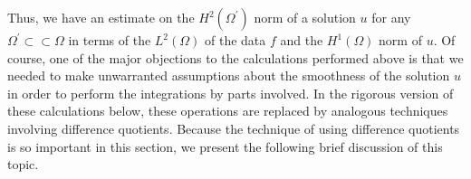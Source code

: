 Thus, we have an estimate on the $H^2(\Omega^{\prime})$ norm of a solution $u$ for any $\Omega^{\prime}\subset\subset\Omega$ in terms of the $L^2(\Omega)$ of the data $f$ and the $H^1(\Omega)$ norm of $u$. Of course, one of the major objections to the calculations performed above is that we needed to make unwarranted assumptions about the smoothness of the solution $u$ in order to perform the integrations by parts involved. In the rigorous version of these calculations below, these operations are replaced by analogous techniques involving difference quotients. Because the technique of using difference quotients is so important in this section, we present the following brief discussion of this topic.
